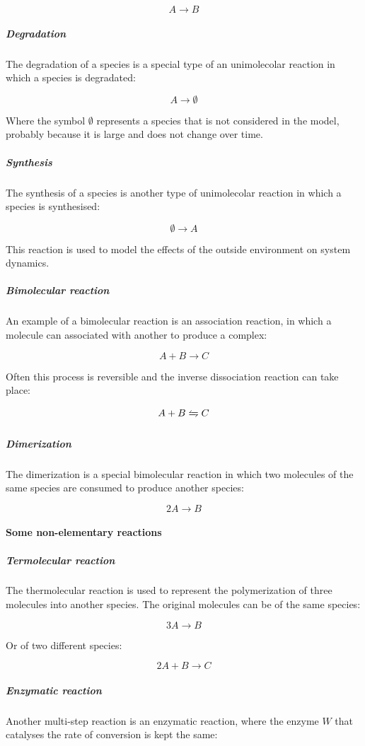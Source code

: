         $$A\rightarrow B$$

        \subparagraph{Degradation}
        The degradation of a species is a special type of an unimolecolar reaction in which a species is degradated:

        $$A\rightarrow\emptyset$$

        Where the symbol $\emptyset$ represents a species that is not considered in the model, probably because it is large and does not change over time.

        \subparagraph{Synthesis}
        The synthesis of a species is another type of unimolecolar reaction in which a species is synthesised:

        $$\emptyset\rightarrow A$$

        This reaction is used to model the effects of the outside environment on system dynamics.

        \subparagraph{Bimolecular reaction}
        An example of a bimolecular reaction is an association reaction, in which a molecule can associated with another to produce a complex:

        $$A+B\rightarrow C$$

        Often this process is reversible and the inverse dissociation reaction can take place:

        $$A+B\xleftrightharpoons[]{} C$$

        \subparagraph{Dimerization}
        The dimerization is a special bimolecular reaction in which two molecules of the same species are consumed to produce another species:

        $$2A\rightarrow B$$

      \paragraph{Some non-elementary reactions}

        \subparagraph{Termolecular reaction}
        The thermolecular reaction is used to represent the polymerization of three molecules into another species.
        The original molecules can be of the same species:

        $$3A\rightarrow B$$

        Or of two different species:

        $$2A +B\rightarrow C$$

        \subparagraph{Enzymatic reaction}
        Another multi-step reaction is an enzymatic reaction, where the enzyme $W$ that catalyses the rate of conversion is kept the same:

